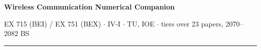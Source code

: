 \documentclass[10pt]{article}
\begin{document}
{\LARGE\bfseries Wireless Communication \gap\textcolor{sub}{Numerical Companion}}\par
{\footnotesize\color{sub} EX 715 (BEI) / EX 751 (BEX) $\cdot$ IV-I $\cdot$ TU, IOE
$\cdot$ tiers over 23 papers, 2070--2082 BS}
\vspace{3pt}\hrule\vspace{4pt}




\end{document}
